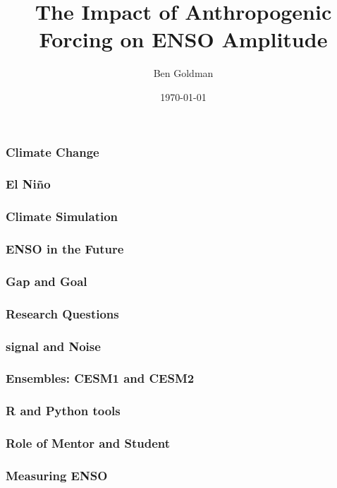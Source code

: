 \documentclass{beamer}
\title{The Impact of Anthropogenic Forcing on ENSO Amplitude}
\author{Ben Goldman}
\date{\today}
\begin{document}
\maketitle

\begin{frame}
  \frametitle{Climate Change}
  \citet{bjerknes1969atmospheric}

\end{frame}

\begin{frame}
  \frametitle{El Niño}

\end{frame}

\begin{frame}
  \frametitle{Climate Simulation}

\end{frame}

\begin{frame}
  \frametitle{ENSO in the Future}

\end{frame}

\begin{frame}
  \frametitle{Gap and Goal}

\end{frame}

\begin{frame}
  \frametitle{Research Questions}

\end{frame}

\begin{frame}
  \frametitle{signal and Noise}

\end{frame}

\begin{frame}
  \frametitle{Ensembles: CESM1 and CESM2}

\end{frame}

\begin{frame}
  \frametitle{R and Python tools}

\end{frame}

\begin{frame}
  \frametitle{Role of Mentor and Student}

\end{frame}

\begin{frame}
  \frametitle{Measuring ENSO}

\end{frame}
\end{document}

